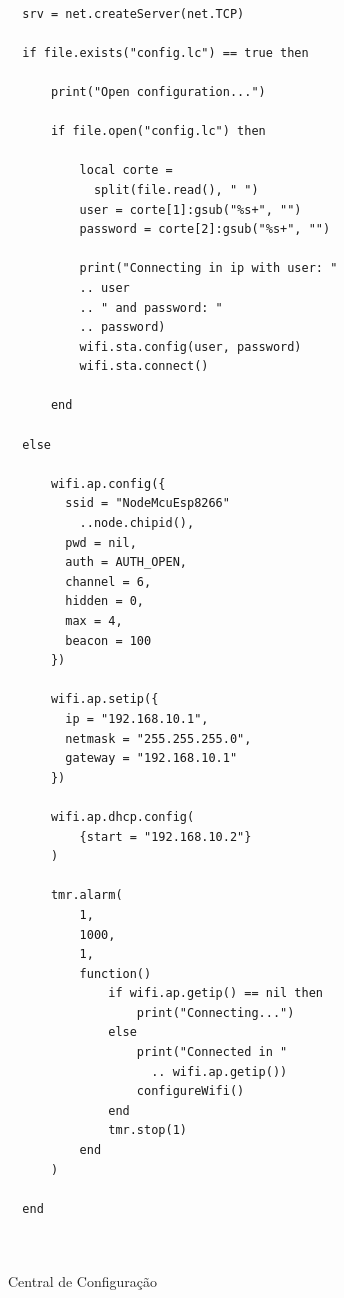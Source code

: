 \documentclass[journal]{IEEEtran}
\begin{document}
\begin{figure}[H]
\centering

\begin{lstlisting}

  srv = net.createServer(net.TCP)

  if file.exists("config.lc") == true then

      print("Open configuration...")

      if file.open("config.lc") then

          local corte = 
            split(file.read(), " ")
          user = corte[1]:gsub("%s+", "")
          password = corte[2]:gsub("%s+", "")
          
          print("Connecting in ip with user: " 
          .. user 
          .. " and password: " 
          .. password)
          wifi.sta.config(user, password)
          wifi.sta.connect()

      end

  else

      wifi.ap.config({
        ssid = "NodeMcuEsp8266"
          ..node.chipid(), 
        pwd = nil, 
        auth = AUTH_OPEN, 
        channel = 6, 
        hidden = 0, 
        max = 4, 
        beacon = 100
      })

      wifi.ap.setip({
        ip = "192.168.10.1", 
        netmask = "255.255.255.0", 
        gateway = "192.168.10.1"
      })

      wifi.ap.dhcp.config(
          {start = "192.168.10.2"}
      )

      tmr.alarm(
          1,
          1000,
          1,
          function()
              if wifi.ap.getip() == nil then
                  print("Connecting...")
              else
                  print("Connected in " 
                    .. wifi.ap.getip())
                  configureWifi()
              end
              tmr.stop(1)
          end
      )

  end



\end{lstlisting}

\caption{Central de Configuração}
\label{alg:trimcc}
\end{figure}


\ifCLASSOPTIONcaptionsoff
  \newpage
\fi
\end{document}
